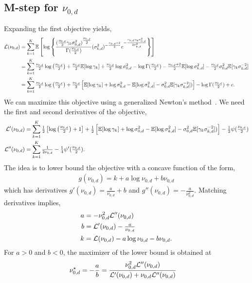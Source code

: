 \subsection{M-step for \texorpdfstring{$\nu_{0,d}$}{ν₀}}
Expanding the first objective yields,
\begin{align*}
    \mathcal{L}(\nu_{0,d})
    &= \sum_{k=1}^K \mathbb{E} \left[ \log \left\{ \frac{(\tfrac{\nu_{0,d}}{2} \gamma_k \sigma_{0,d}^2)^{\tfrac{\nu_{0,d}}{2}}}{\Gamma(\frac{\nu_{0,d}}{2}) } (\sigma_{k,d}^2)^{-\frac{\nu_{0,d} + 2}{2}} e^{-\frac{\nu_{0,d} \gamma_k \sigma_{0,d}^2}{2 \sigma_{k,d}^2}} \right\}  \right] \\
    &= \sum_{k=1}^K  \tfrac{\nu_{0,d}}{2} \log \left(\tfrac{\nu_{0,d}}{2}\right) + \tfrac{\nu_{0,d}}{2} \mathbb{E}[\log \gamma_k] + \tfrac{\nu_{0,d}}{2} \log \sigma_{0,d}^2 - \log \Gamma(\tfrac{\nu_{0,d}}{2}) -\tfrac{\nu_{0,d} + 2}{2} \mathbb{E}[\log \sigma_{k,d}^2] - \tfrac{\nu_{0,d}}{2} \sigma_{0,d}^2 \mathbb{E}[\gamma_k \sigma_{k,d}^{-2}] \\
    &= \sum_{k=1}^K  \tfrac{\nu_{0,d}}{2} \log \left(\tfrac{\nu_{0,d}}{2}\right) + \tfrac{\nu_{0,d}}{2} \left[\mathbb{E}[\log \gamma_k] + \log \sigma_{0,d}^2 - \mathbb{E}[\log \sigma_{k,d}^2] - \sigma_{0,d}^2 \mathbb{E}[\gamma_k \sigma_{k,d}^{-2}]) \right] - \log \Gamma(\tfrac{\nu_{0,d}}{2}) + c.
\end{align*}
We can maximize this objective using a generalized Newton's method~\citep{minka2000beyond}.
We need the first and second derivatives of the objective,
\begin{align*}
    \mathcal{L}'(\nu_{0,d})
    &= \sum_{k=1}^K  \tfrac{1}{2} \left[\log \left(\tfrac{\nu_{0,d}}{2}\right) + 1 \right] + \tfrac{1}{2} \left[\mathbb{E}[\log \gamma_k] +  \log \sigma_{0,d}^2 - \mathbb{E}[\log \sigma_{k,d}^2] - \sigma_{0,d}^2 \mathbb{E}[\gamma_k \sigma_{k,d}^{-2}]) \right] - \tfrac{1}{2} \psi(\tfrac{\nu_{0,d}}{2}) \\
    \mathcal{L}''(\nu_{0,d})
    &= \sum_{k=1}^K  \tfrac{1}{2 \nu_{0,d}} - \tfrac{1}{4} \psi'(\tfrac{\nu_{0,d}}{2}).
\end{align*}
The idea is to lower bound the objective with a concave function of the form,
\begin{align*}
    g(\nu_{0,d}) = k + a \log \nu_{0,d} + b \nu_{0,d}
\end{align*}
which has derivatives $g'(\nu_{0,d}) = \tfrac{a}{\nu_{0,d}} + b$ and $g''(\nu_{0,d}) = -\tfrac{a}{\nu_{0,d}^2}$. Matching derivatives implies,
\begin{align*}
    a &= -\nu_{0,d}^2 \mathcal{L}''(\nu_{0,d}) \\
    b &= \mathcal{L}'(\nu_{0,d}) - \tfrac{a}{\nu_{0,d}} \\
    k &= \mathcal{L}(\nu_{0,d}) - a\log \nu_{0,d} -b \nu_{0,d}.
\end{align*}
For $a > 0$ and $b<0$, the maximizer of the lower bound is obtained at
\begin{align}
    \nu_{0,d}^\star
    &= -\frac{a}{b} = \frac{\nu_{0,d}^2 \mathcal{L}''(\nu_{0,d})}{\mathcal{L}'(\nu_{0,d}) + \nu_{0,d} \mathcal{L}''(\nu_{0,d})}
\end{align}


